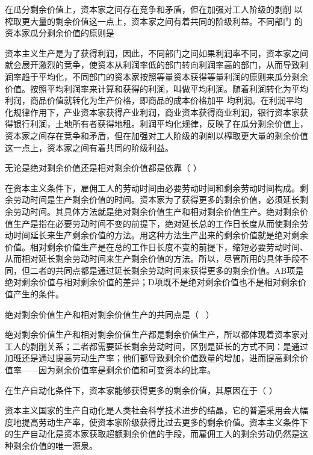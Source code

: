 \question 在瓜分剩余价值上，资本家之间存在竞争和矛盾，但在加强对工人阶级的剥削
以榨取更大量的剩余价值这一点上，资本家之间有着共同的阶级利益。不同部门
的资本家瓜分剩余价值的原则是
\par{}
\begin{solution}资本主义生产是为了获得利润，因此，不同部门之间如果利润率不同，资本家之间就会展开激烈的竞争，使资本从利润率低的部门转向利润率高的部门，从而导致利润率趋于平均化，不同部门的资本家按照等量资本获得等量利润的原则来瓜分剩余价值。按照平均利润率来计算和获得的利润，叫做平均利润。随着利润转化为平均利润，商品价值就转化为生产价格，即商品的成本价格加平
均利润。在利润平均化规律作用下，产业资本家获得产业利润，商业资本获得商业利润，银行资本家获得银行利润，土地所有者获得地租。利润平均化规律，反映了在瓜分剩余价值上，资本家之间存在竞争和矛盾，但在加强对工人阶级的剥削以榨取更大量的剩余价值这一点上，资本家之间有着共同的阶级利益。
\end{solution}
\question 无论是绝对剩余价值还是相对剩余价值都是依靠（ ）
\par{}
\begin{solution}在资本主义条件下，雇佣工人的劳动时间由必要劳动时间和剩余劳动时间构成。剩余劳动时间是生产剩余价值的时间。资本家为了获得更多的剩余价值，必须延长剩余劳动时间。其具体方法就是绝对剩余价值生产和相对剩余价值生产。绝对剩余价值生产是指在必要劳动时间不变的前提下，绝对延长总的工作日长度从而使剩余劳动时间延长来生产剩余价值的方法。用这种方法生产出来的剩余价值就是绝对剩余价值。相对剩余价值生产是在总的工作日长度不变的前提下，缩短必要劳动时间、从而相对延长剩余劳动时间来生产剩余价值的方法。所以，尽管所用的具体手段不同，但二者的共同点都是通过延长剩余劳动时间来获得更多的剩余价值。AB项是绝对剩余价值与相对剩余价值的差异；D项既不是绝对剩余价值也不是相对剩余价值产生的条件。
\end{solution}
\question 绝对剩余价值生产和相对剩余价值生产的共同点是（ ~）
\par\fourch{\textcolor{red}{都延长了剩余劳动时间}}{\textcolor{red}{都体现着资本家对工人的剥削关系}}{\textcolor{red}{都增加了剩余价值量}}{\textcolor{red}{都提高了剩余价值率}}
\begin{solution}绝对剩余价值生产和相对剩余价值生产都是剩余价值生产，所以都体现着资本家对工人的剥削关系；二者都需要延长剩余劳动时间，区别是延长的方式不同：是通过加班还是通过提高劳动生产率；他们都导致剩余价值数量的增加，进而提高剩余价值率------因为剩余价值率是剩余价值和可变资本的比率。
\end{solution}
\question 在生产自动化条件下，资本家能够获得更多的剩余价值，其原因在于（ ）
\par{}
\begin{solution}资本主义国家的生产自动化是人类社会科学技术进步的结晶，它的普遍采用会大幅度地提高劳动生产率，使资本家阶级获得比过去更多的剩余价值。资本主义条件下的生产自动化是资本家获取超额剩余价值的手段，而雇佣工人的剩余劳动仍然是这种剩余价值的唯一源泉。
\end{solution}
